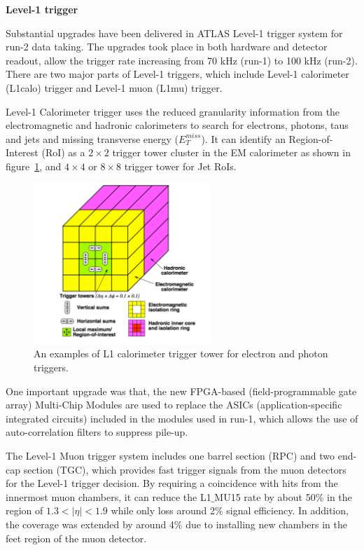 \textbf{Level-1 trigger}

Substantial upgrades have been delivered in ATLAS Level-1 trigger system for run-2 data taking.
The upgrades took place in both hardware and detector readout, allow the trigger rate increasing from 70 kHz (run-1) to 100 kHz (run-2).
There are two major parts of Level-1 triggers, which include Level-1 calorimeter (L1calo) trigger and Level-1 muon (L1mu) trigger.

Level-1 Calorimeter trigger uses the reduced granularity information from the electromagnetic and hadronic calorimeters to search for electrons, photons, taus and jets and missing transverse energy ($E_{T}^{miss}$).
It can identify an Region-of-Interest (RoI) as a $2 \times 2$ trigger tower cluster in the EM calorimeter as shown in figure~\ref{fig:trig_tower}, 
and $4 \times 4$ or $8 \times 8$ trigger tower for Jet RoIs.
\begin{figure}[!htb]
  \centering
  \includegraphics[width=0.6\textwidth]{figures/Detector/trig_tower.png}
  \caption{An examples of L1 calorimeter trigger tower for electron and photon triggers\cite{Pasztor:2063746}.}
  \label{fig:trig_tower}
\end{figure}
One important upgrade was that, the new FPGA-based (field-programmable gate array) Multi-Chip Modules are used to replace the ASICs (application-specific integrated circuits) included in the modules used in run-1,
which allows the use of auto-correlation filters to suppress pile-up.

The Level-1 Muon trigger system includes one barrel section (RPC) and two end-cap section (TGC), which provides fast trigger signals from the muon detectors for the Level-1 trigger decision.
By requiring a coincidence with hits from the innermost muon chambers, it can reduce the L1$\_$MU15 rate by about 50\% in the region of $1.3 < |\eta| < 1.9$ while only loss around 2\% signal efficiency.
In addition, the coverage was extended by around 4\% due to installing new chambers in the feet region of the muon detector.

